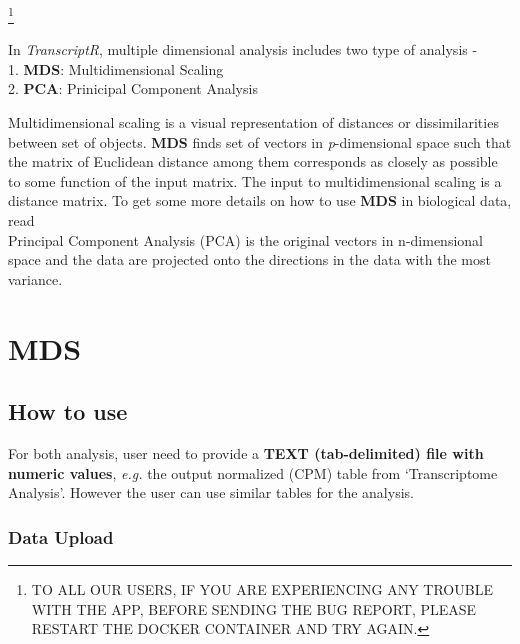 \documentclass[
  a4paper,
  DIV=11,
  numbers=noendperiod,
  oneside,
  open=any]{scrreport}
\begin{document}
\footnote{TO ALL OUR USERS, IF YOU ARE EXPERIENCING ANY TROUBLE WITH THE
  APP, BEFORE SENDING THE BUG REPORT, PLEASE RESTART THE DOCKER
  CONTAINER AND TRY AGAIN.}

In \emph{TranscriptR}, multiple dimensional analysis includes two type
of analysis -\\
1. \textbf{MDS}: Multidimensional Scaling\\
2. \textbf{PCA}: Prinicipal Component Analysis

Multidimensional scaling is a visual representation of distances or
dissimilarities between set of objects. \textbf{MDS} finds set of
vectors in \emph{p}-dimensional space such that the matrix of Euclidean
distance among them corresponds as closely as possible to some function
of the input matrix. The input to multidimensional scaling is a distance
matrix. To get some more details on how to use \textbf{MDS} in
biological data, read
\autocite{mugavin2008multidimensional,lacher1987interpretation,lacher1988comparison}\\
Principal Component Analysis (PCA) is the original vectors in
n-dimensional space and the data are projected onto the directions in
the data with the most variance.

\section{MDS}\label{mds}

\subsection{How to use}\label{how-to-use-2}

For both analysis, user need to provide a \textbf{TEXT (tab-delimited)
file with numeric values}, \emph{e.g.} the output normalized (CPM) table
from `Transcriptome Analysis'. However the user can use similar tables
for the analysis.

\subsubsection{Data Upload}\label{data-upload-1}
\end{document}
